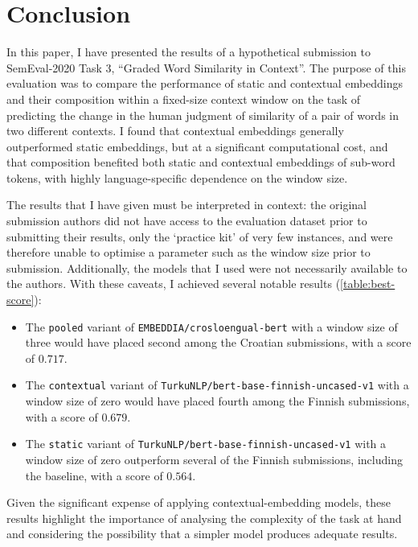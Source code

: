 \section{Conclusion}
\label{sec:conclusion}

In this paper, I have presented the results of a hypothetical submission to
SemEval-2020 Task 3, ``Graded Word Similarity in Context''.
The purpose of this evaluation was to compare the performance of static and contextual
embeddings and their composition within a fixed-size context window on the task of
predicting the change in the human judgment of similarity of a pair of words in two
different contexts.
I found that contextual embeddings generally outperformed static embeddings, but at a
significant computational cost, and that composition benefited both static and
contextual embeddings of sub-word tokens, with highly language-specific dependence on
the window size.

The results that I have given must be interpreted in context: the original submission
authors did not have access to the evaluation dataset prior to submitting their
results, only the `practice kit' of very few instances, and were therefore unable to
optimise a parameter such as the window size prior to submission.
Additionally, the models that I used were not necessarily available to the authors.
With these caveats, I achieved several notable results (\cref{table:best-score}):
\begin{itemize}
  \item The \texttt{pooled} variant of \texttt{EMBEDDIA/crosloengual-bert} with a window
        size of three would have placed second among the Croatian submissions, with a
        score of $0.717$.
  \item The \texttt{contextual} variant of \texttt{TurkuNLP/bert-base-finnish-uncased-v1}
        with a window size of zero would have placed fourth among the Finnish
        submissions, with a score of $0.679$.
  \item The \texttt{static} variant of \texttt{TurkuNLP/bert-base-finnish-uncased-v1}
        with a window size of zero outperform several of the Finnish submissions,
        including the baseline, with a score of $0.564$.
\end{itemize}
Given the significant expense of applying contextual-embedding models, these results
highlight the importance of analysing the complexity of the task at hand and
considering the possibility that a simpler model produces adequate results.
